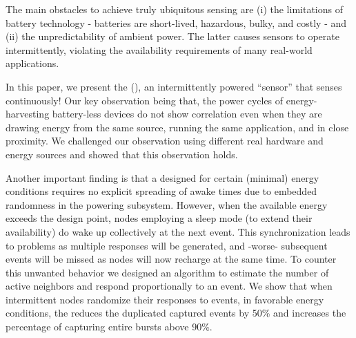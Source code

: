 The main obstacles to achieve truly ubiquitous sensing are (i) the limitations of battery technology - batteries are short-lived, hazardous, bulky, and costly - and (ii) the unpredictability of ambient power. The latter causes sensors to operate intermittently, violating the availability requirements of many real-world applications. 

In this paper, we present the \textit{\fullsys} (\sys), an intermittently powered ``sensor'' that senses continuously!
Our key observation being that, the power cycles of energy-harvesting battery-less devices do not show correlation even when they are drawing energy from the same source, running the same application, and in close proximity.
We challenged our observation using different real hardware and energy sources and showed that this observation holds.

Another important finding is that a \sys designed for certain (minimal) energy conditions requires no explicit spreading of awake times due to embedded randomness in the powering subsystem. However, when the available energy exceeds the design point, nodes employing a sleep mode (to extend their availability) do wake up collectively at the next event. This synchronization leads to problems as multiple responses will be generated, and -worse- subsequent events will be missed as nodes will now recharge at the same time.
To counter this unwanted behavior we designed an algorithm to estimate the number of active neighbors and respond proportionally to an event. 
We show that when intermittent nodes randomize their responses to events, in favorable energy conditions, the \sys reduces the duplicated captured events by 50\% and increases the percentage of capturing entire bursts above 90\%. 
